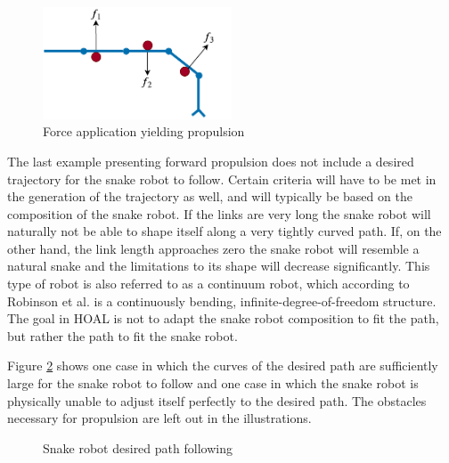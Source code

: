 \begin{figure}[h!]
    \centering
    \includegraphics[width=0.5\textwidth]{figures/theory/obst-push-prop.pdf}
    \caption{Force application yielding propulsion}
    \label{fig:force-prop}
\end{figure}


The last example presenting forward propulsion does not include a desired trajectory for the snake robot to follow. Certain criteria will have to be met in the generation of the trajectory as well, and will typically be based on the composition of the snake robot. If the links are very long the snake robot will naturally not be able to shape itself along a very tightly curved path. If, on the other hand, the link length approaches zero the snake robot will resemble a natural snake and the limitations to its shape will decrease significantly. This type of robot is also referred to as a continuum robot, which according to Robinson et al. \cite{robinson1999continuum} is a continuously bending, infinite-degree-of-freedom structure. The goal in HOAL is not to adapt the snake robot composition to fit the path, but rather the path to fit the snake robot.

Figure \ref{fig:path-following} shows one case in which the curves of the desired path are sufficiently large for the snake robot to follow and one case in which the snake robot is physically unable to adjust itself perfectly to the desired path. The obstacles necessary for propulsion are left out in the illustrations.

\begin{figure}[H]
    \centering

    \hfil

    \caption{Snake robot desired path following}
    \label{fig:path-following}
\end{figure}

